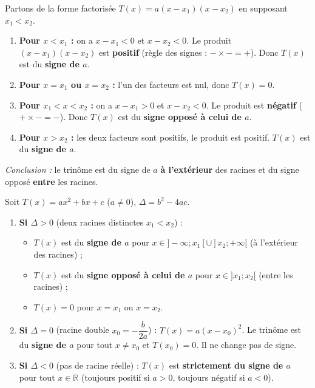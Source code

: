 \documentclass[11pt]{article}
\begin{document}
\begin{experience}
Partons de la forme factorisée $T(x) = a(x-x_1)(x-x_2)$ en supposant $x_1 < x_2$.
\begin{enumerate}
    \item \textbf{Pour $x < x_1$ :} on a $x-x_1 < 0$ et $x-x_2 < 0$. Le produit $(x-x_1)(x-x_2)$ est \textbf{positif} (règle des signes : $- \times - = +$). Donc $T(x)$ est du \textbf{signe de $a$}.
    \item \textbf{Pour $x = x_1$ ou $x = x_2$ :} l'un des facteurs est nul, donc $T(x)=0$.
    \item \textbf{Pour $x_1 < x < x_2$ :} on a $x-x_1 > 0$ et $x-x_2 < 0$. Le produit est \textbf{négatif} ($+ \times - = -$). Donc $T(x)$ est du \textbf{signe opposé à celui de $a$}.
    \item \textbf{Pour $x > x_2$ :} les deux facteurs sont positifs, le produit est positif. $T(x)$ est du \textbf{signe de $a$}.
\end{enumerate}
\emph{Conclusion :} le trinôme est du signe de $a$ \textbf{à l'extérieur} des racines et du signe opposé \textbf{entre} les racines.
\end{experience}

\begin{propriete}
Soit $T(x)=ax^2+bx+c$ ($a \neq 0$), $\Delta = b^2-4ac$.
\begin{enumerate}
    \item \textbf{Si $\Delta > 0$} (deux racines distinctes $x_1 < x_2$) :
    \begin{itemize}
        \item $T(x)$ est du \textbf{signe de $a$} pour $x \in ]-\infty; x_1[ \cup ]x_2; +\infty[$ (à l'extérieur des racines) ;
        \item $T(x)$ est du \textbf{signe opposé à celui de $a$} pour $x \in ]x_1; x_2[$ (entre les racines) ;
        \item $T(x)=0$ pour $x=x_1$ ou $x=x_2$.
    \end{itemize}
    \item \textbf{Si $\Delta = 0$} (racine double $x_0 = -\dfrac{b}{2a}$) : $T(x) = a(x-x_0)^2$. Le trinôme est du \textbf{signe de $a$} pour tout $x \neq x_0$ et $T(x_0)=0$. Il ne change pas de signe.
    \item \textbf{Si $\Delta < 0$} (pas de racine réelle) : $T(x)$ est \textbf{strictement du signe de $a$} pour tout $x \in \mathbb{R}$ (toujours positif si $a>0$, toujours négatif si $a<0$).
\end{enumerate}
\end{propriete}
\end{document}
